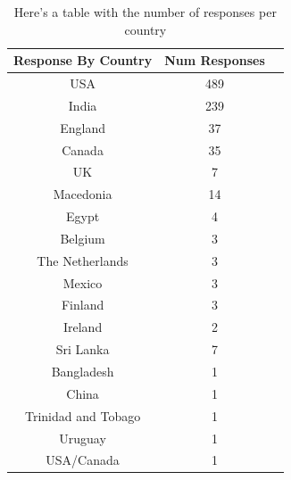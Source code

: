 \begin{table}
\begin{center}

\begin{tabular}{|c|c|c|}
\hline 
Response By Country   &   Num Responses   \\ \hline
USA   &   489   \\ \hline
India   &   239   \\ \hline
England   &   37   \\ \hline
Canada   &   35   \\ \hline
UK   &   7   \\ \hline
Macedonia   &   14   \\ \hline
Egypt   &   4   \\ \hline
Belgium   &   3   \\ \hline
The Netherlands   &   3   \\ \hline
Mexico   &   3   \\ \hline
Finland   &   3   \\ \hline
Ireland   &   2   \\ \hline
Sri Lanka   &   7   \\ \hline
Bangladesh   &   1   \\ \hline
China   &   1   \\ \hline
Trinidad and Tobago   &   1   \\ \hline
Uruguay   &   1   \\ \hline
USA/Canada   &   1   \\ \hline
\end{tabular}

\captionfonts
\caption[Countries and responses]{ Here's a table with the number of responses per country}
\label{table:countryTally}
\end{center}
\end{table}

